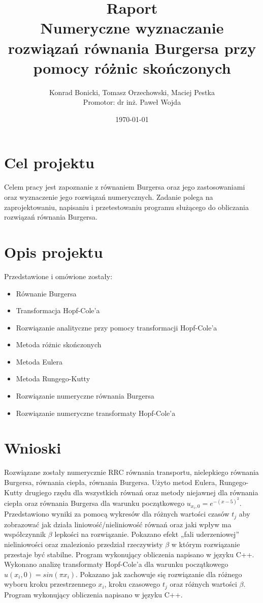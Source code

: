 \documentclass[a4paper,12pt]{article}
\title{Raport \\ Numeryczne wyznaczanie rozwiązań równania Burgersa przy pomocy różnic skończonych}
\author{Konrad Bonicki, Tomasz Orzechowski, Maciej Pestka \\ Promotor: dr inż. Paweł Wojda }
\date{\today}
\begin{document}
\maketitle

\section*{Cel projektu}
Celem pracy jest zapoznanie z równaniem Burgersa oraz jego zastosowaniami oraz wyznaczenie jego rozwiązań numerycznych. Zadanie polega na zaprojektowaniu, napisaniu i przetestowaniu programu służącego do obliczania rozwiązań równania Burgersa. 

\section*{Opis projektu}
Przedstawione i omówione zostały:
\begin{itemize}
\item Równanie Burgersa
\item Transformacja Hopf-Cole’a
\item Rozwiązanie analityczne przy pomocy transformacji Hopf-Cole’a
\item Metoda różnic skończonych
\item Metoda Eulera 
\item Metoda Rungego-Kutty
\item Rozwiązanie numeryczne równania Burgersa
\item Rozwiązanie numeryczne transformaty Hopf-Cole’a
\end{itemize}

\section*{Wnioski}
Rozwiązane zostały numerycznie RRC równania transportu, nielepkiego równania Burgersa, równania ciepła, równania Burgersa. Użyto metod Eulera, Rungego-Kutty drugiego rzędu dla wszystkich równań oraz metody niejawnej dla równania ciepła oraz równania Burgersa dla warunku początkowego $u_{x_{i},0}=e^{-(x-5)^{2}}$. Przedstawiono wyniki za pomocą wykresów dla różnych wartości czasów $t_{j}$ aby zobrazować jak działa liniowość/nieliniowość równań oraz jaki wpływ ma współczynnik $\beta$ lepkości na rozwiązanie. Pokazano efekt „fali uderzeniowej” nieliniowości oraz znalezionio przedział rzeczywisty $\beta$ w którym rozwiązanie przestaje być stabilne. Program wykonujący obliczenia napisano w języku C++.\\
Wykonano analizę transformaty Hopf-Cole’a dla warunku początkowego $u(x_{i},0)=sin(\pi x_{i})$. Pokazano jak zachowuje się rozwiązanie dla różnego wyboru kroku przestrzennego $x_{i}$, kroku czasowego $t_{j}$ oraz różnych wartości $\beta$. Program wykonujący obliczenia napisano w języku C++.
\end{document}
